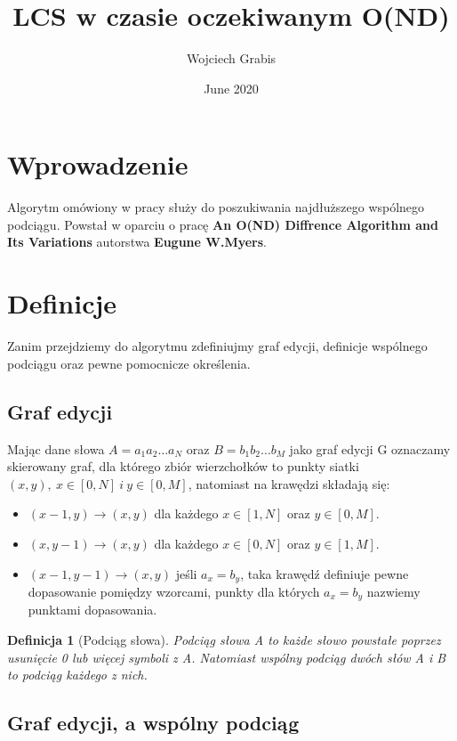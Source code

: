\documentclass[12pt]{article}
\title{LCS w czasie oczekiwanym O(ND)}
\author{Wojciech Grabis}
\date{June 2020}
\newtheorem*{definition}{Definicja}
\begin{document}
\maketitle

\section{Wprowadzenie}

Algorytm omówiony w pracy służy do poszukiwania najdłuższego wspólnego podciągu. Powstał w oparciu o pracę \textbf{An O(ND) Diffrence Algorithm and Its Variations} autorstwa \textbf{Eugune W.Myers}.
\section{Definicje}
Zanim przejdziemy do algorytmu zdefiniujmy graf edycji, definicje wspólnego podciągu oraz pewne pomocnicze określenia.

\subsection{Graf edycji}
 Mając dane słowa $A = a_{1}a_{2}\dots a_{N}$ oraz $B = b_{1}b_{2}\dots b_{M}$ jako graf edycji G oznaczamy skierowany graf, dla którego zbiór wierzchołków to punkty siatki $(x,y),\:x\in[0,N]\:i\:y\in[0,M]$, natomiast na krawędzi składają się:
\begin{itemize}
    \item $(x-1,y) \xrightarrow{}(x,y)$ dla każdego $x\in[1,N]$ oraz $y\in[0,M]$.
    \item $(x,y-1) \xrightarrow{}(x,y)$ dla każdego $x\in[0,N]$ oraz $y\in[1,M]$.
    \item $(x-1,y-1) \xrightarrow{}(x,y)$ jeśli $a_{x} = b_{y}$, taka krawędź definiuje pewne dopasowanie pomiędzy wzorcami, punkty dla których $a_{x} = b_{y}$ nazwiemy punktami dopasowania.
\end{itemize}

\begin{definition}[Podciąg słowa]

Podciąg słowa A to każde słowo powstałe poprzez usunięcie 0 lub więcej symboli z A. Natomiast wspólny podciąg dwóch słów A i B to podciąg każdego z nich. 
\end{definition}

\subsection{Graf edycji, a wspólny podciąg}
\end{document}
